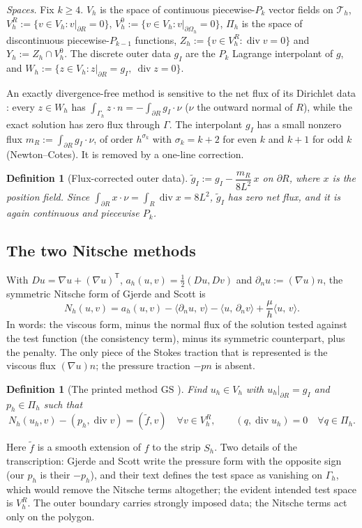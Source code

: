 \documentclass[pdflatex,sn-mathphys-num]{sn-jnl}
\theoremstyle{thmstyleone}
\theoremstyle{thmstylethree}
\newtheorem{definition}[theorem]{Definition}
\newcommand{\Gh}{\Gamma_h}
\newcommand{\Oh}{\Omega_h}
\newcommand{\Th}{\mathcal T_h}
\newcommand{\Vh}{V_h}
\newcommand{\VR}{V_h^R}
\newcommand{\VO}{V_h^0}
\newcommand{\Pih}{\Pi_h}
\newcommand{\Zh}{Z_h}
\newcommand{\Wh}{W_h}
\newcommand{\Yh}{Y_h}
\newcommand{\gI}{g_I}
\newcommand{\dn}{\partial_n}
\newcommand{\ft}{\tilde f}
\newcommand{\ip}[2]{\langle #1,\, #2\rangle}
\newcommand{\GS}{\mathrm{GS}}
\renewcommand{\div}{\operatorname{div}}
\begin{document}
\emph{Spaces.} Fix $k\ge4$. $\Vh$ is the space of continuous piecewise-$P_k$ vector fields on $\Th$, $\VR:=\{v\in\Vh:v|_{\partial R}=0\}$, $\VO:=\{v\in\Vh:v|_{\partial\Oh}=0\}$, $\Pih$ is the space of discontinuous piecewise-$P_{k-1}$ functions, $\Zh:=\{v\in\VR:\div v=0\}$ and $\Yh:=\Zh\cap\VO$. The discrete outer data $\gI$ are the $P_k$ Lagrange interpolant of $g$, and $\Wh:=\{z\in\Vh:z|_{\partial R}=\gI,\ \div z=0\}$.

An exactly divergence-free method is sensitive to the net flux of its Dirichlet data \cite{EickmannScottTscherpel2025}: every $z\in\Wh$ has $\int_{\Gh}z\cdot n=-\int_{\partial R}\gI\cdot\nu$ ($\nu$ the outward normal of $R$), while the exact solution has zero flux through $\Gamma$. The interpolant $\gI$ has a small nonzero flux $m_R:=\int_{\partial R}\gI\cdot\nu$, of order $h^{\sigma_k}$ with $\sigma_k=k+2$ for even $k$ and $k+1$ for odd $k$ (Newton--Cotes). It is removed by a one-line correction.

\begin{definition}[Flux-corrected outer data]\label{def:flux}
$\tilde g_I:=\gI-\dfrac{m_R}{8L^2}\,x$ on $\partial R$, where $x$ is the position field. Since $\int_{\partial R}x\cdot\nu=\int_R\div x=8L^2$, $\tilde g_I$ has zero net flux, and it is again continuous and piecewise $P_k$.
\end{definition}

\subsection{The two Nitsche methods}
With $Du=\nabla u+(\nabla u)^{\mathsf T}$, $a_h(u,v)=\frac12(Du,Dv)$ and $\dn u:=(\nabla u)n$, the symmetric Nitsche form of Gjerde and Scott is
\[
N_h(u,v)=a_h(u,v)-\ip{\dn u}{v}-\ip{u}{\dn v}+\frac{\mu}{h}\ip{u}{v}.
\]
In words: the viscous form, minus the normal flux of the solution tested against the test function (the consistency term), minus its symmetric counterpart, plus the penalty. The only piece of the Stokes traction that is represented is the viscous flux $(\nabla u)n$; the pressure traction $-pn$ is absent.

\begin{definition}[The printed method $\GS$ {\cite[(27)--(28)]{GjerdeScott2024}}]
Find $u_h\in\Vh$ with $u_h|_{\partial R}=\gI$ and $p_h\in\Pih$ such that
\[
N_h(u_h,v)-(p_h,\div v)=(\ft,v)\quad\forall v\in\VR,\qquad (q,\div u_h)=0\quad\forall q\in\Pih.
\]
\end{definition}
Here $\ft$ is a smooth extension of $f$ to the strip $S_h$. Two details of the transcription: Gjerde and Scott write the pressure form with the opposite sign (our $p_h$ is their $-p_h$), and their text defines the test space as vanishing on $\Gh$, which would remove the Nitsche terms altogether; the evident intended test space is $\VR$. The outer boundary carries strongly imposed data; the Nitsche terms act only on the polygon.
\end{document}
